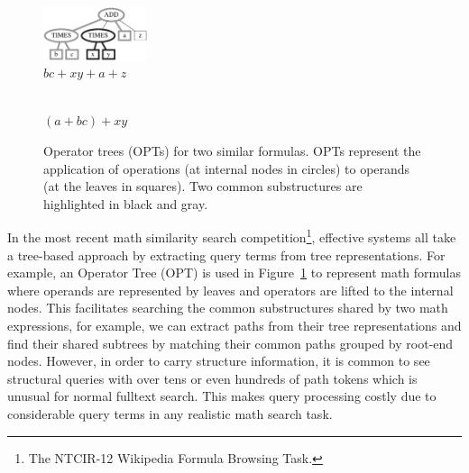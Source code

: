 \documentclass[runningheads]{llncs}
\begin{document}
\begin{figure}[!t]

\begin{center}
\begin{minipage}[b]{1.5in}
\begin{center}
\includegraphics[width=1.2in]{fig/tree3.eps}\\
$bc + xy + a + z$
\end{center}
\end{minipage}
\hspace*{.0in}
\begin{minipage}[b]{1.5in}
\begin{center}
\\
$(a + bc) + xy$
\end{center}
\end{minipage}
\end{center}

\caption{Operator trees (OPTs) for two similar formulas. OPTs represent the application of operations (at internal nodes in circles) to operands (at the leaves in squares). Two common substructures are highlighted in black and gray.}
\label{intro}
\end{figure}

In the most recent math similarity search competition\footnote{The NTCIR-12 Wikipedia Formula Browsing Task.}, effective systems all take a tree-based approach by extracting query terms from tree representations.
For example, an Operator Tree (OPT) is used in Figure~\ref{intro} to represent math formulas where operands are represented by leaves and operators are lifted to the internal nodes.
This facilitates searching the common substructures shared by two math expressions, for example, we can extract paths from their tree representations and find their shared subtrees by matching their common paths grouped by root-end nodes. 
However, in order to carry structure information, it is common to see structural queries with over tens or even hundreds of path tokens which is unusual for normal fulltext search. This makes query processing costly due to considerable query terms in any realistic math search task.
\end{document}
